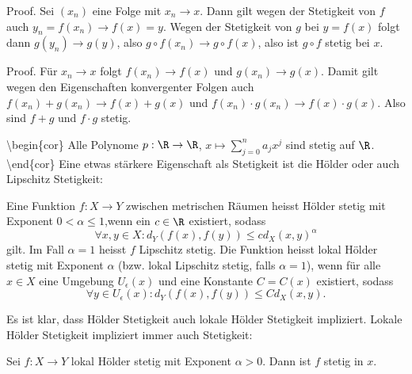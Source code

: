 \documentclass[letterpaper,10pt,english]{jupyterBook}
\begin{document}
\begin{emphBox}{}{}
Proof.  Sei \((x_n)\) eine Folge mit \(x_n \rightarrow x\). Dann gilt wegen der Stetigkeit von \(f\) auch \(y_n=f(x_n) \rightarrow f(x) = y\). Wegen der Stetigkeit von \(g\) bei \(y=f(x)\) folgt dann \(g(y_n) \rightarrow g(y)\), also \(g\circ f(x_n) \rightarrow g \circ f(x)\), also ist \(g \circ f\) stetig bei \(x\).
\end{emphBox}
\label{stetigkeit/stetigkeit:theorem-6}
\begin{theorem}{}{}


\end{theorem}

\begin{emphBox}{}{}
Proof.  Für \(x_n \rightarrow x\) folgt \(f(x_n) \rightarrow f(x)\) und \(g(x_n) \rightarrow g(x)\). Damit gilt wegen den Eigenschaften konvergenter Folgen auch \(f(x_n) + g(x_n) \rightarrow f(x) + g(x)\) und
\(f(x_n) \cdot g(x_n) \rightarrow f(x) \cdot g(x)\). Also sind \(f+g\) und \(f \cdot g\) stetig.
\end{emphBox}

\textbackslash{}begin\{cor\}
Alle Polynome \(p: \R  \rightarrow \R\), \( x \mapsto \sum_{j=0}^n a_j x^j\) sind stetig auf \(\R\).
\textbackslash{}end\{cor\}
Eine etwas stärkere Eigenschaft als Stetigkeit ist die Hölder  oder auch Lipschitz Stetigkeit:
\label{stetigkeit/stetigkeit:definition-7}
\begin{definition}{}{}



Eine Funktion \(f: X \rightarrow Y\) zwischen metrischen Räumen heisst Hölder stetig mit Exponent \(0 < \alpha \leq 1\),wenn ein \(c \in \R\) existiert, sodass
\begin{equation*}
 \forall x,y \in X: d_Y(f(x),f(y)) \leq c d_X(x,y)^\alpha
\end{equation*}
gilt. Im Fall \(\alpha = 1\) heisst \(f\) Lipschitz stetig.
Die Funktion heisst lokal Hölder stetig mit Exponent \(\alpha\) (bzw. lokal Lipschitz stetig, falls \(\alpha =1\)), wenn für alle \(x \in X\) eine Umgebung \(U_\epsilon(x)\) und eine Konstante \(C=C(x)\) existiert, sodass
\begin{equation*}
 \forall y \in U_\epsilon(x): d_Y(f(x),f(y)) \leq C d_X(x,y) .
\end{equation*}\end{definition}

Es ist klar, dass Hölder Stetigkeit auch lokale Hölder Stetigkeit impliziert. Lokale Hölder Stetigkeit impliziert immer auch Stetigkeit:
\label{stetigkeit/stetigkeit:theorem-8}
\begin{theorem}{}{}



Sei \(f: X \rightarrow Y\) lokal Hölder stetig mit Exponent \(\alpha > 0\). Dann ist \(f\) stetig in \(x\).
\end{theorem}
\end{document}
